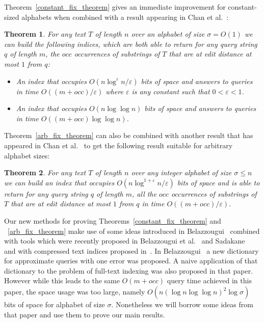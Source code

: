 \documentclass{article}
\newcommand{\?}{\mskip1.5mu}
\renewcommand{\epsilon}{\varepsilon}
\newtheorem{theorem}{Theorem}
\begin{document}
Theorem~\ref{constant_fix_theorem} gives an immediate improvement for constant-sized alphabets when combined with a result appearing in Chan et al.~\cite{chan2011linear}:
\begin{theorem}
\label{full_constant_theorem}
For any text $T$ of length $n$ over an alphabet of size $\sigma=O(1)$ we can build the following indices, which are both able to return for any query string $q$ of length $m$, the $occ$ occurrences of substrings of $T$ that are at edit distance at most $1$ from $q$:
\begin{itemize}
\item An index that occupies $O(n \log^\epsilon n/\epsilon)$ bits of space and answers to queries in time $O((m+occ)/\epsilon)$ where $\epsilon$ is any constant such that $0<\epsilon<1$. 
\item An index that occupies $O(n\log\log n)$ bits of space and answers to queries in time $O((m+occ)\log\log n)$. 
\end{itemize}
\end{theorem}

Theorem~\ref{arb_fix_theorem} can also be combined with another result that has appeared in Chan et al.~\cite{chan2011linear} to get the following result suitable for arbitrary alphabet sizes:
\begin{theorem}
\label{full_arb_theorem}
For any text $T$ of length $n$ over any integer alphabet of size $\sigma\leq n$ we can build an index that occupies $O(n\log^{1+\epsilon}n/\epsilon)$ bits of space and is able to return for any query string $q$ of length $m$, all the $occ$ occurrences of substrings of $T$ that are at edit distance at most $1$ from $q$ in time $O((m+occ)/\epsilon)$. 
\end{theorem}

Our new methods for proving Theorems~\ref{constant_fix_theorem} and ~\ref{arb_fix_theorem} make use of some ideas introduced in Belazzougui~\cite{B09} combined with tools which were recently proposed in Belazzougui et al.~\cite{BBPV10} and Sadakane~\cite{Sa07} and with compressed text indices proposed in~\cite{FM05,GV05}. In Belazzougui~\cite{B09} a new dictionary for approximate queries with one error was proposed. A naive application of that dictionary to the problem of full-text indexing was also proposed in that paper. However while this leads to the same $O(m+occ)$ query time achieved in this paper, the space usage was too large,  namely $O(n(\log n \log \log n)^2\log\sigma)$ bits of space for alphabet of size $\sigma$. Nonetheless we will borrow some ideas from that paper and use them to prove our main results. 
\end{document}
